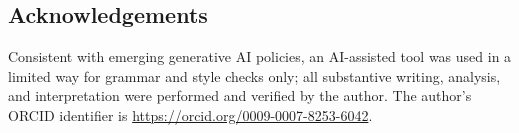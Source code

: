 \subsection*{Acknowledgements}
Consistent with emerging generative AI policies, an AI-assisted tool was used in a limited way for grammar and style checks only; all substantive writing, analysis, and interpretation were performed and verified by the author. The author’s ORCID identifier is \url{https://orcid.org/0009-0007-8253-6042}.
